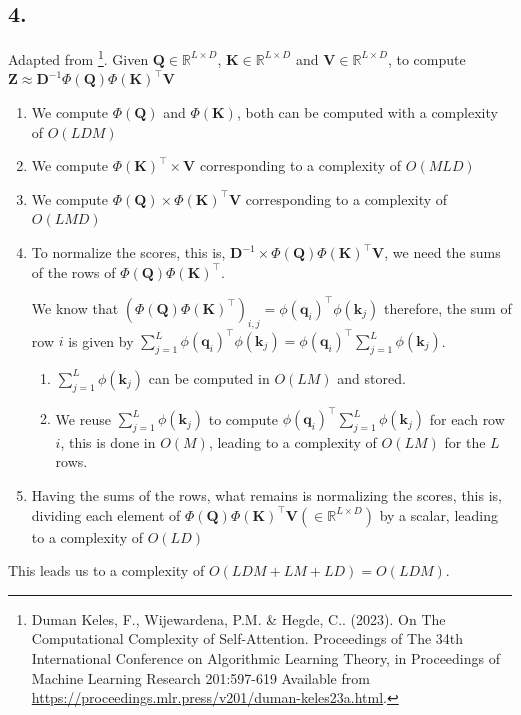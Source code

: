 \documentclass[11pt]{article}
\begin{document}
\subsection{4.}
Adapted from \footnote{Duman Keles, F., Wijewardena, P.M. \& Hegde, C.. (2023). On The Computational Complexity of Self-Attention. Proceedings of The 34th International Conference on Algorithmic Learning Theory, in Proceedings of Machine Learning Research 201:597-619 Available from \url{https://proceedings.mlr.press/v201/duman-keles23a.html}.}. Given $\bm{Q} \in \mathbb{R}^{L \times D}$, $\bm{K} \in \mathbb{R}^{L \times D}$ and $\bm{V} \in \mathbb{R}^{L \times D}$, to compute $\bm{Z} \approx \bm{D}^{-1} \Phi \left( \bm{Q} \right) \Phi \left( \bm{K} \right)^{\top} \bm{V}$
\begin{enumerate}
\item We compute $\Phi \left( \bm{Q} \right)$ and $\Phi \left( \bm{K} \right)$, both can be computed with a complexity of $O \left( L D M\right)$
\item We compute $\Phi \left( \bm{K} \right)^{\top} \times \bm{V}$ corresponding to a complexity of $O \left(M L D \right)$
\item We compute $\Phi \left( \bm{Q} \right) \times \Phi \left( \bm{K} \right)^{\top} \bm{V}$ corresponding to a complexity of $O \left( L M D \right)$
\item To normalize the scores, this is, $\bm{D}^{-1} \times \Phi \left( \bm{Q} \right) \Phi \left( \bm{K} \right)^{\top} \bm{V}$, we need the sums of the rows of $\Phi \left( \bm{Q} \right) \Phi \left( \bm{K} \right)^{\top}$.

  We know that $\left( \Phi \left( \bm{Q} \right) \Phi \left( \bm{K} \right)^{\top} \right)_{i, j} = \phi \left( \bm{q}_{i} \right)^{\top} \phi \left( \bm{k}_{j} \right)$ therefore, the sum of row $i$ is given by $\sum_{j = 1}^{L} \phi \left( \bm{q}_{i} \right)^{\top} \phi \left( \bm{k}_{j} \right) = \phi \left( \bm{q}_{i} \right)^{\top} \sum_{j = 1}^{L} \phi \left( \bm{k}_{j} \right)$.
  \begin{enumerate}
  \item $\sum_{j = 1}^{L} \phi \left( \bm{k}_{j} \right)$ can be computed in $O \left( L M \right)$ and stored.
  \item We reuse $\sum_{j = 1}^{L} \phi \left( \bm{k}_{j} \right)$ to compute $\phi \left( \bm{q}_{i} \right)^{\top} \sum_{j = 1}^{L} \phi \left( \bm{k}_{j} \right)$ for each row $i$, this is done in $O \left( M \right)$, leading to a complexity of $O \left( L M \right)$ for the $L$ rows.
  \end{enumerate}
\item Having the sums of the rows, what remains is normalizing the scores, this is, dividing each element of $\Phi \left( \bm{Q} \right) \Phi \left( \bm{K} \right)^{\top} \bm{V} \left( \in \mathbb{R}^{L \times D} \right)$ by a scalar, leading to a complexity of $O \left( LD \right)$
\end{enumerate}
This leads us to a complexity of $O \left( LDM + LM + LD \right) = O \left( LDM \right)$.
\pagebreak
\end{document}
